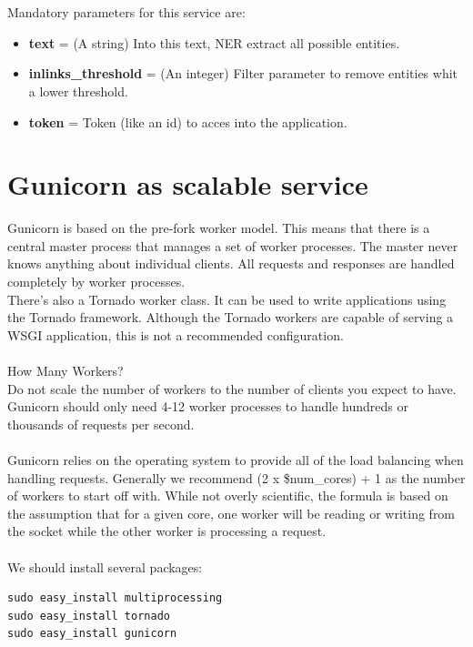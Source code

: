 \documentclass[a4paper,11pt]{article}
\begin{document}
\\
\\
Mandatory parameters for this service are:
\begin{itemize}
\item {\bf text} =  (A string) Into this text, NER extract all possible entities.
\item {\bf inlinks\_threshold} =  (An integer) Filter parameter to remove entities whit a lower threshold.
\item {\bf token} =  Token (like an id) to acces into the application.
\end{itemize}





\newpage
\section{Gunicorn as scalable service}
Gunicorn is based on the pre-fork worker model. This means that there is a central master process that manages a set of worker processes. The master never knows anything about individual clients. All requests and responses are handled completely by worker processes.
\\
There's also a Tornado worker class. It can be used to write applications using the Tornado framework. Although the Tornado workers are capable of serving a WSGI application, this is not a recommended configuration.
\\
\\
How Many Workers?
\\
Do not scale the number of workers to the number of clients you expect to have. Gunicorn should only need 4-12 worker processes to handle hundreds or thousands of requests per second.
\\
\\
Gunicorn relies on the operating system to provide all of the load balancing when handling requests. Generally we recommend (2 x \$num\_cores) + 1 as the number of workers to start off with. While not overly scientific, the formula is based on the assumption that for a given core, one worker will be reading or writing from the socket while the other worker is processing a request.
\\
\\
We should install several packages:
\begin{verbatim}
sudo easy_install multiprocessing
sudo easy_install tornado
sudo easy_install gunicorn
\end{verbatim}
\end{document}
